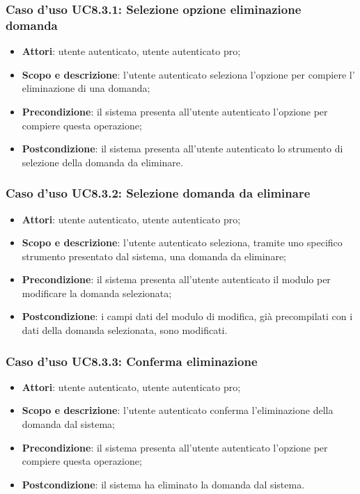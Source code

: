 	\subsubsection{Caso d'uso UC8.3.1: Selezione opzione eliminazione domanda}
	\begin{itemize}
		\item
			\textbf{Attori}: utente autenticato, utente autenticato pro;
		\item
			\textbf{Scopo e descrizione}: l'utente autenticato seleziona l'opzione per compiere l' eliminazione di una domanda;
		\item		
			\textbf{Precondizione}: il sistema presenta all'utente autenticato l'opzione per compiere questa operazione;
		\item
			\textbf{Postcondizione}: il sistema presenta all'utente autenticato lo strumento di selezione della domanda da eliminare.
	\end{itemize}
	\subsubsection{Caso d'uso UC8.3.2: Selezione domanda da eliminare}
	\begin{itemize}
		\item
			\textbf{Attori}: utente autenticato, utente autenticato pro;
		\item
			\textbf{Scopo e descrizione}: l'utente autenticato seleziona, tramite uno specifico strumento presentato dal sistema, una domanda da eliminare;
		\item		
			\textbf{Precondizione}: il sistema presenta all'utente autenticato il modulo per modificare la domanda selezionata;
		\item
			\textbf{Postcondizione}: i campi dati del modulo di modifica, già precompilati con i dati della domanda selezionata, sono modificati.
	\end{itemize}		
	\subsubsection{Caso d'uso UC8.3.3: Conferma eliminazione}
	\begin{itemize}
		\item
			\textbf{Attori}: utente autenticato, utente autenticato pro;
		\item
			\textbf{Scopo e descrizione}: l'utente autenticato conferma l'eliminazione della domanda dal sistema;
		\item		
			\textbf{Precondizione}: il sistema presenta all'utente autenticato l'opzione per compiere questa operazione;
		\item
			\textbf{Postcondizione}: il sistema ha eliminato la domanda dal sistema.
	\end{itemize}	